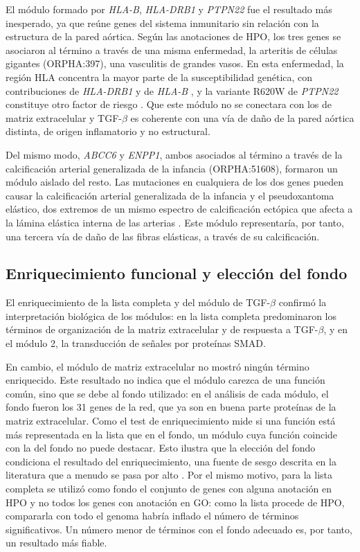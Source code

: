 El módulo formado por \textit{HLA-B}, \textit{HLA-DRB1} y \textit{PTPN22} fue el resultado más inesperado, ya que reúne genes del sistema inmunitario sin relación con la estructura de la pared aórtica. Según las anotaciones de HPO, los tres genes se asociaron al término a través de una misma enfermedad, la arteritis de células gigantes (ORPHA:397), una vasculitis de grandes vasos. En esta enfermedad, la región HLA concentra la mayor parte de la susceptibilidad genética, con contribuciones de \textit{HLA-DRB1} y de \textit{HLA-B} \cite{Carmona2015}, y la variante R620W de \textit{PTPN22} constituye otro factor de riesgo \cite{Serrano2013}. Que este módulo no se conectara con los de matriz extracelular y TGF-$\beta$ es coherente con una vía de daño de la pared aórtica distinta, de origen inflamatorio y no estructural.

Del mismo modo, \textit{ABCC6} y \textit{ENPP1}, ambos asociados al término a través de la calcificación arterial generalizada de la infancia (ORPHA:51608), formaron un módulo aislado del resto. Las mutaciones en cualquiera de los dos genes pueden causar la calcificación arterial generalizada de la infancia y el pseudoxantoma elástico, dos extremos de un mismo espectro de calcificación ectópica que afecta a la lámina elástica interna de las arterias \cite{Nitschke2012}. Este módulo representaría, por tanto, una tercera vía de daño de las fibras elásticas, a través de su calcificación.

\subsection{Enriquecimiento funcional y elección del fondo}

El enriquecimiento de la lista completa y del módulo de TGF-$\beta$ confirmó la interpretación biológica de los módulos: en la lista completa predominaron los términos de organización de la matriz extracelular y de respuesta a TGF-$\beta$, y en el módulo 2, la transducción de señales por proteínas SMAD.

En cambio, el módulo de matriz extracelular no mostró ningún término enriquecido. Este resultado no indica que el módulo carezca de una función común, sino que se debe al fondo utilizado: en el análisis de cada módulo, el fondo fueron los 31 genes de la red, que ya son en buena parte proteínas de la matriz extracelular. Como el test de enriquecimiento mide si una función está más representada en la lista que en el fondo, un módulo cuya función coincide con la del fondo no puede destacar. Esto ilustra que la elección del fondo condiciona el resultado del enriquecimiento, una fuente de sesgo descrita en la literatura que a menudo se pasa por alto \cite{Timmons2015}. Por el mismo motivo, para la lista completa se utilizó como fondo el conjunto de genes con alguna anotación en HPO y no todos los genes con anotación en GO: como la lista procede de HPO, compararla con todo el genoma habría inflado el número de términos significativos. Un número menor de términos con el fondo adecuado es, por tanto, un resultado más fiable.

